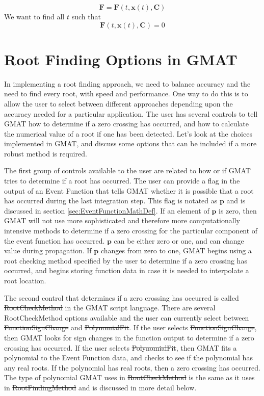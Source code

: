 \begin{equation}
    \mathbf{F} = \mathbf{F} (t, \mathbf{x}(t),\mathbf{C}   )
\end{equation}
%
We want to find all $t$ such that
%
\begin{equation}
    \mathbf{F} (t, \mathbf{x}(t),\mathbf{C}   ) = 0
\end{equation}


\section{Root Finding Options in GMAT}

In implementing a root finding approach, we need to balance accuracy
and the need to find every root, with speed and performance.  One
way to do this is to allow the user to select between different
approaches depending upon the accuracy needed for a particular
application.   The user has several controls to tell GMAT how to
determine if a zero crossing has occurred, and how to calculate the
numerical value of a root if one has been detected. Let's look at
the choices implemented in GMAT, and discuss some options that can
be included if a more robust method is required.

The first group of controls available to the user are related to how
or if GMAT tries to determine if a root has occurred.  The user can
provide a flag in the output of an Event Function that tells GMAT
whether it is possible that a root has occurred during the last
integration step. This flag is notated as $\mathbf{p}$ and is
discussed in section \ref{sec:EventFunctionMathDef}.  If an element
of $\mathbf{p}$ is zero, then GMAT will not use more sophisticated
and therefore more computationally intensive methods to determine if
a zero crossing for the particular component of the event function
has occurred.  $\mathbf{p}$ can be either zero or one, and can
change value during propagation.  If $\mathbf{p}$ changes from zero
to one, GMAT begins using a root checking method specified by the
user to determine if a zero crossing has occurred, and begins
storing function data  in case it is needed to interpolate a root
location.

The second control that determines if a  zero crossing has occurred
is called \st{RootCheckMethod} in the GMAT script language.  There
are several RootCheckMethod options available and the user can
currently select between \st{FunctionSignChange} and
\st{PolynomialFit}.  If the user selects \st{FunctionSignChange},
then GMAT looks for sign changes in the function output to determine
if a zero crossing has occurred.  If the user selects
\st{PolynomialFit}, then GMAT fits a polynomial to the Event
Function data, and checks to see if the polynomial has any real
roots. If the polynomial has real roots, then a zero crossing has
occurred. The type of polynomial GMAT uses in \st{RootCheckMethod}
is the same as it uses in \st{RootFindingMethod} and is discussed in
more detail below.

